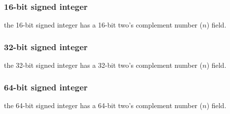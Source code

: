 \begin{samepage}
\subsubsection{16-bit signed integer}

the 16-bit signed integer has a 16-bit two's complement number ($n$) field.

\vspace{0.5em}

\par\noindent
{}
\end{samepage}

\begin{samepage}
\subsubsection{32-bit signed integer}

the 32-bit signed integer has a 32-bit two's complement number ($n$) field.

\vspace{0.5em}

\par\noindent
{}
\end{samepage}

\begin{samepage}
\subsubsection{64-bit signed integer}

the 64-bit signed integer has a 64-bit two's complement number ($n$) field.

\vspace{0.5em}

\par\noindent
{}
\end{samepage}

